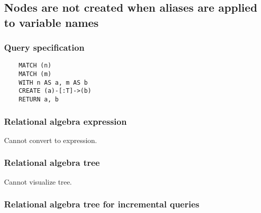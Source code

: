 	\subsection{Nodes are not created when aliases are applied to variable names}

	\subsubsection*{Query specification}

	\begin{lstlisting}
	MATCH (n)
	MATCH (m)
	WITH n AS a, m AS b
	CREATE (a)-[:T]->(b)
	RETURN a, b
	\end{lstlisting}


	\subsubsection*{Relational algebra expression}

	Cannot convert to expression.

	\subsubsection*{Relational algebra tree}

	Cannot visualize tree.

	\subsubsection*{Relational algebra tree for incremental queries}

